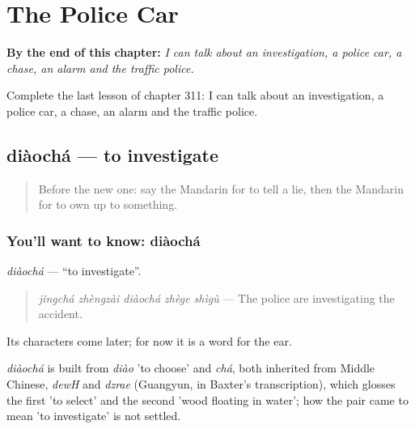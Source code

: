 
\chapter{The Police Car}
\label{ch:zh-the-police-car}

\begin{chapteropening}
\textbf{By the end of this chapter:} \emph{I can talk about an investigation, a police car, a chase, an alarm and the traffic police.}

Complete the last lesson of chapter 311: I can talk about an investigation, a police car, a chase, an alarm and the traffic police.
\end{chapteropening}

\section[diàochá]{diàochá — to investigate}

\label{lesson:ZH-C311-diaocha}



\begin{quote}
Before the new one: say the Mandarin for to tell a lie, then the Mandarin for to own up to something.
\end{quote}

\subsection*{You'll want to know: diàochá}
\emph{diàochá} — \textquotedblleft{}to investigate\textquotedblright{}.

\begin{quote}
\emph{jǐngchá zhèngzài diàochá zhège shìgù} — The police are investigating the accident.
\end{quote}

Its characters come later; for now it is a word for the ear.

\begin{cousinweb}
\emph{diàochá} is built from \emph{diào} 'to choose' and \emph{chá}, both inherited from Middle Chinese, \emph{dewH} and \emph{dzrae} (Guangyun, in Baxter's transcription), which glosses the first 'to select' and the second 'wood floating in water'; how the pair came to mean 'to investigate' is not settled.
\end{cousinweb}

